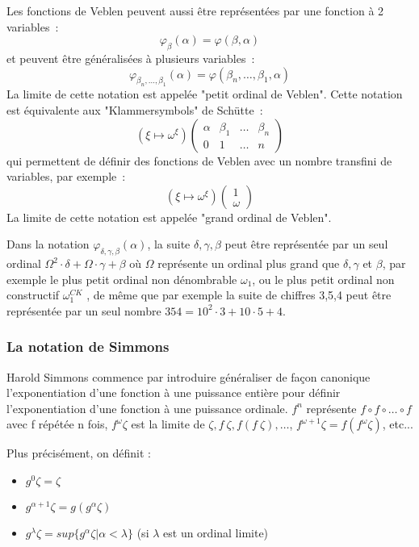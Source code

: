 \documentclass[12pt]{beamer}
\begin{document}
\begin{frame}

\small

Les fonctions de Veblen peuvent aussi être représentées par une fonction à 2 variables :
\[ \varphi_\beta(\alpha) = \varphi(\beta,\alpha) \]
et peuvent être généralisées à plusieurs variables :
\[ \varphi_{\beta_n,\ldots,\beta_1}(\alpha) = \varphi(\beta_n,\ldots,\beta_1,\alpha) \]
La limite de cette notation est appelée "petit ordinal de Veblen".
Cette notation est équivalente aux "Klammersymbols" de Schütte :
\[ ( \xi \mapsto \omega^\xi ) 
  \begin{pmatrix}
    \alpha & \beta_1 & \ldots & \beta_n \\
    0 & 1 & \ldots & n
  \end{pmatrix} \]
qui permettent de définir des fonctions de Veblen avec un nombre transfini de variables, par exemple :
\[ ( \xi \mapsto \omega^\xi ) 
  \begin{pmatrix}
    1 \\
    \omega
  \end{pmatrix} \]
La limite de cette notation est appelée "grand ordinal de Veblen".

\end{frame}
\begin{frame}

Dans la notation \( \varphi_{\delta,\gamma,\beta}(\alpha) \), la suite \( \delta,\gamma,\beta \) peut être représentée par un seul ordinal \( \Omega^2 \cdot \delta + \Omega \cdot \gamma + \beta \) où \( \Omega \) représente un ordinal plus grand que \( \delta, \gamma \) et \( \beta \), par exemple le plus petit ordinal non dénombrable $\omega_1$, ou le plus petit ordinal non constructif $\omega_1^{CK}$ , de même que par exemple la suite de chiffres 3,5,4 peut être représentée par un seul nombre \( 354 = 10^2 \cdot 3 + 10 \cdot 5 + 4 \).

\end{frame}
\begin{frame}
\frametitle{La notation de Simmons}

Harold Simmons commence par introduire généraliser de façon canonique l'exponentiation d'une fonction à une puissance entière pour définir l'exponentiation d'une fonction à une puissance ordinale.
\( f^n \) représente \( f \circ f \circ \ldots \circ f \) avec f répétée n fois, \( f^\omega \zeta \) est la limite de \( \zeta, f\ \zeta, f(f\ \zeta), \ldots \), \( f^{\omega+1} \zeta = f(f^\omega \zeta) \), etc...

Plus précisément, on définit :

\begin{itemize}
     \setlength{\itemsep}{1pt}
     \setlength{\parskip}{0pt}
     \setlength{\parsep}{0pt}
\item \( g^0 \zeta = \zeta \)
\item \( g^{\alpha+1} \zeta = g (g^\alpha \zeta) \)
\item \( g^\lambda \zeta = sup \lbrace g^\alpha \zeta | \alpha < \lambda \rbrace \) (si \( \lambda \) est un ordinal limite)
\end{itemize}

\end{frame}
\end{document}
